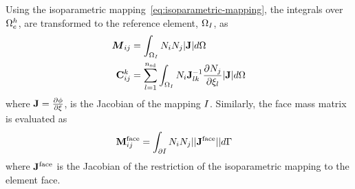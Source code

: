 Using the isoparametric mapping~\eqref{eq:isoparametric-mapping}, the integrals over $\Omega_e^{h}$, are transformed to the reference element, $\Omega_{I}$, as
\begin{align*}
\boldsymbol{M}_{ij} &= \int_{\Omega_{I}} N_i N_j |\mathbf{J}| d\Omega \\
\mathbf{C}^{k}_{ij} &= 
                               \sum_{l=1}^{n_\textrm{sd}}
                                \int_{\Omega_{I}} N_i
                               \mathbf{J}_{lk}^{-1}
                               \frac{\partial N_j}{\partial \xi_{l}}
                             |\mathbf{J}|
                             d\Omega
\end{align*}
where $\mathbf{J} = \frac{\partial \phi}{ \partial \xi}$, is the Jacobian of the mapping $I$. Similarly, the face mass matrix is evaluated as
\begin{align*}
\mathbf{M}^{\textrm{face}}_{ij} &= \int_{\partial I} N_i N_j || \mathbf{J}^{\textrm{face}} || d\Gamma
\end{align*}
where $\mathbf{J}^{\textrm{face}}$ is the Jacobian of the restriction of the isoparametric mapping to the element face.

